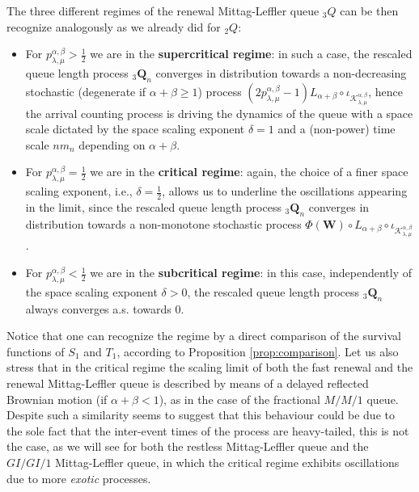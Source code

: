 \documentclass[]{amsart}
\numberwithin{equation}{section}
\theoremstyle{remark}
\theoremstyle{definition}
\begin{document}
The three different regimes of the renewal Mittag-Leffler queue ${}_3Q$ can be then recognize analogously as we already did for ${}_2Q$:
\begin{itemize}
	\item For $p_{\lambda,\mu}^{\alpha,\beta}>\frac{1}{2}$ we are in the \textbf{supercritical regime}: in such a case, the rescaled queue length process ${}_3{\mathbf{Q}}_n$ converges in distribution towards a non-decreasing stochastic (degenerate if $\alpha+\beta \ge 1$) process $(2p_{\lambda,\mu}^{\alpha,\beta}-1)L_{\alpha+\beta} \circ \iota_{\mathcal{K}_{\lambda,\mu}^{\alpha,\beta}}$, hence the arrival counting process is driving the dynamics of the queue with a space scale dictated by the space scaling exponent $\delta=1$ and a (non-power) time scale $nm_n$ depending on $\alpha+\beta$. 
	\item For $p_{\lambda,\mu}^{\alpha,\beta}=\frac{1}{2}$ we are in the \textbf{critical regime}: again, the choice of a finer space scaling exponent, i.e., $\delta=\frac{1}{2}$, allows us to underline the oscillations appearing in the limit, since the rescaled queue length process ${}_3{\mathbf{Q}}_n$ converges in distribution towards a non-monotone stochastic process $\Phi(\mathbf{W})\circ L_{\alpha+\beta}\circ \iota_{\mathcal{K}_{\lambda,\mu}^{\alpha,\beta}}$. 
	\item For $p_{\lambda,\mu}^{\alpha,\beta}<\frac{1}{2}$ we are in the \textbf{subcritical regime}: in this case, independently of the space scaling exponent $\delta>0$, the rescaled queue length process ${}_3\mathbf{Q}_n$ always converges a.s. towards $0$.
\end{itemize}
Notice that one can recognize the regime by a direct comparison of the survival functions of ${S}_1$ and ${T}_1$, according to Proposition \ref{prop:comparison}. Let us also stress that in the critical regime the scaling limit of both the fast renewal and the renewal Mittag-Leffler queue is described by means of a delayed reflected Brownian motion (if $\alpha+\beta<1$), as in the case of the fractional $M/M/1$ queue. Despite such a similarity seems to suggest that this behaviour could be due to the sole fact that the inter-event times of the process are heavy-tailed, this is not the case, as we will see for both the restless Mittag-Leffler queue and the $GI/GI/1$ Mittag-Leffler queue, in which the critical regime exhibits oscillations due to more \textit{exotic} processes.
\end{document}
